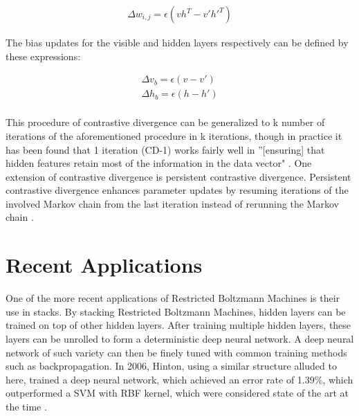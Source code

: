 \documentclass[journal]{IEEEtran}
\begin{document}
\begin{equation}
\begin{aligned}
\Delta w_{i,j} = \epsilon(vh^{T} - v'h'^{T})
\end{aligned}
\end{equation}

The bias updates for the visible and hidden layers respectively can be defined by these expressions:

\begin{equation}
\begin{aligned}
\Delta v_{b} = \epsilon(v - v')\\
\Delta h_{b} = \epsilon(h - h')\\
\end{aligned}
\end{equation}

This procedure of contrastive divergence can be generalized to k number of iterations of the aforementioned procedure in k iterations, though in practice it has been found that 1 iteration (CD-1) works fairly well in ''[ensuring] that hidden features retain most of the information in the data vector" \cite{hinton2010practical}.  One extension of contrastive divergence is persistent contrastive divergence.  Persistent contrastive divergence enhances parameter updates by resuming iterations of the involved Markov chain from the last iteration instead of rerunning the Markov chain \cite{tieleman2008training}.

\section{Recent Applications}
One of the more recent applications of Restricted Boltzmann Machines is their use in stacks.  By stacking Restricted Boltzmann Machines, hidden layers can be trained on top of other hidden layers. After training multiple hidden layers, these layers can be unrolled to form a deterministic deep neural network.  A deep neural network of such variety can then be finely tuned with common training methods such as backpropagation.  In 2006, Hinton, using a similar structure alluded to here, trained a deep neural network, which achieved an error rate of 1.39\%, which outperformed a SVM with RBF kernel, which were considered state of the art at the time \cite{hinton2006fast}.
\end{document}
